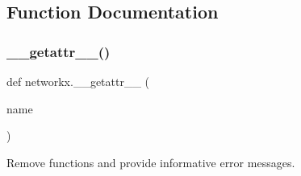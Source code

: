 \subsection{Function Documentation}
\mbox{\label{namespacenetworkx_a815450999704975ad1179cf0d86d7c75}} 
\subsubsection{\texorpdfstring{\+\_\+\+\_\+getattr\+\_\+\+\_\+()}{\_\_getattr\_\_()}}
{\footnotesize\ttfamily def networkx.\+\_\+\+\_\+getattr\+\_\+\+\_\+ (\begin{DoxyParamCaption}\item[{}]{name }\end{DoxyParamCaption})}

\begin{DoxyVerb}Remove functions and provide informative error messages.\end{DoxyVerb}
 